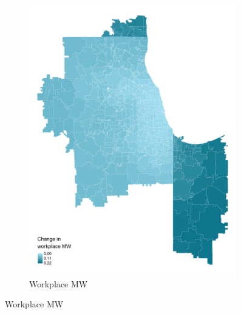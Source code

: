 \documentclass[aspectratio=169, t]{beamer}
\begin{document}
\begin{frame}
\begin{figure}
\begin{subfigure}{0.51\textwidth}
            \includegraphics[width = 0.99\textwidth]{counterfactuals/output/chicago_d_mw_wkp.png}
            \caption*{Workplace MW}
        \end{subfigure}
    \end{figure}
\end{frame}
\end{document}
